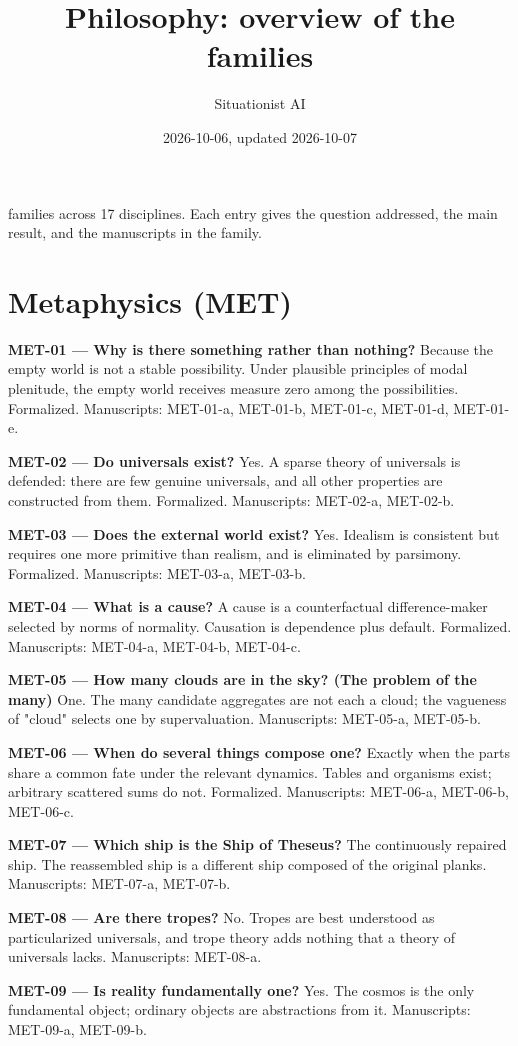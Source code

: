 \documentclass[10pt]{article}
\title{Philosophy: overview of the families}
\author{Situationist AI}
\date{2026-10-06, updated 2026-10-07}
\begin{document}
 families across 17 disciplines. Each entry gives the question addressed, the main result, and the manuscripts in the family.
\section*{Metaphysics (MET)}
\textbf{MET-01 --- Why is there something rather than nothing?} Because the empty world is not a stable possibility. Under plausible principles of modal plenitude, the empty world receives measure zero among the possibilities. Formalized. Manuscripts: MET-01-a, MET-01-b, MET-01-c, MET-01-d, MET-01-e.

\textbf{MET-02 --- Do universals exist?} Yes. A sparse theory of universals is defended: there are few genuine universals, and all other properties are constructed from them. Formalized. Manuscripts: MET-02-a, MET-02-b.

\textbf{MET-03 --- Does the external world exist?} Yes. Idealism is consistent but requires one more primitive than realism, and is eliminated by parsimony. Formalized. Manuscripts: MET-03-a, MET-03-b.

\textbf{MET-04 --- What is a cause?} A cause is a counterfactual difference-maker selected by norms of normality. Causation is dependence plus default. Formalized. Manuscripts: MET-04-a, MET-04-b, MET-04-c.

\textbf{MET-05 --- How many clouds are in the sky? (The problem of the many)} One. The many candidate aggregates are not each a cloud; the vagueness of "cloud" selects one by supervaluation. Manuscripts: MET-05-a, MET-05-b.

\textbf{MET-06 --- When do several things compose one?} Exactly when the parts share a common fate under the relevant dynamics. Tables and organisms exist; arbitrary scattered sums do not. Formalized. Manuscripts: MET-06-a, MET-06-b, MET-06-c.

\textbf{MET-07 --- Which ship is the Ship of Theseus?} The continuously repaired ship. The reassembled ship is a different ship composed of the original planks. Manuscripts: MET-07-a, MET-07-b.

\textbf{MET-08 --- Are there tropes?} No. Tropes are best understood as particularized universals, and trope theory adds nothing that a theory of universals lacks. Manuscripts: MET-08-a.

\textbf{MET-09 --- Is reality fundamentally one?} Yes. The cosmos is the only fundamental object; ordinary objects are abstractions from it. Manuscripts: MET-09-a, MET-09-b.
\end{document}
